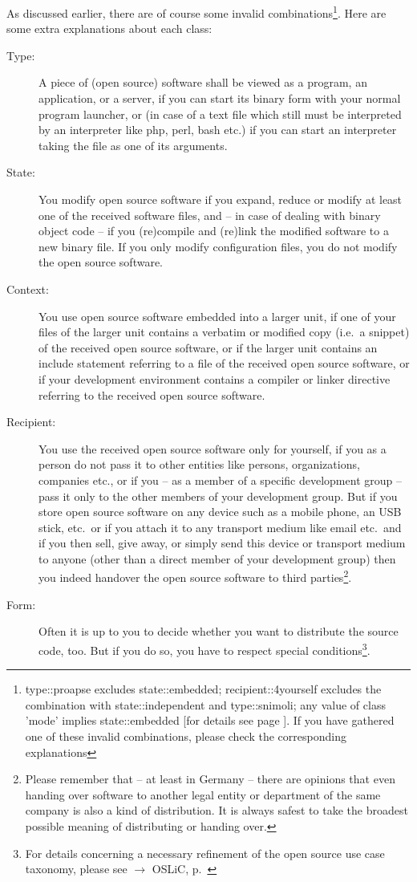 As discussed earlier, there are of course some invalid
combinations\footnote{type::proapse excludes state::embedded;
recipient::4yourself excludes the combination with state::independent and
type::snimoli; any value of class 'mode' implies state::embedded [for details
see page \pageref{InvalidFinderTokenCombinations}]. If you have gathered one of
these invalid combinations, please check the corresponding explanations}. Here
are some extra explanations about each class:

\begin{description}
\item[Type:] A piece of (open source) software shall be viewed as a program, an
application, or a server, if you can start its binary form with your normal
program launcher, or (in case of a text file which still must be interpreted by
an interpreter like php, perl, bash etc.) if you can start an interpreter taking
the file as one of its arguments. \item[State:] You modify open source software
if you expand, reduce or modify at least one of the received software files, and
-- in case of dealing with binary object code -- if you (re)compile and (re)link
the modified software to a new binary file. If you only modify configuration
files, you do not modify the open source software.
\item[Context:] You use open source software embedded into a larger unit, if one
of your files of the larger unit contains a verbatim or modified copy (i.e.\ a
snippet) of the received open source software, or if the larger unit contains an
include statement referring to a file of the received open source software, or
if your development environment contains a compiler or linker directive
referring to the received open source software.
\item[Recipient:] You use the received open source software only for yourself,
if you as a person do not pass it to other entities like persons, organizations,
companies etc., or if you -- as a member of a specific development group -- pass
it only to the other members of your development group. But if you store open
source software on any device such as a mobile phone, an USB stick, etc.\ or if
you attach it to any transport medium like email etc.\ and if you then sell,
give away, or simply send this device or transport medium to anyone (other than
a direct member of your development group) then you indeed handover the open
source software to third parties\footnote{Please remember that -- at least in
Germany -- there are opinions that even handing over software to another legal
entity or department of the same company is also a kind of distribution. It is
always safest to take the broadest possible meaning of distributing or handing
over.}.
\item[Form:] Often it is up to you to decide whether you want to distribute the
source code, too. But if you do so, you have to respect special
conditions\footnote{For details concerning a necessary refinement of the open
source use case taxonomy, please see $\rightarrow$ OSLiC, p.\
\pageref{sec:SourceBinaryDifference}}.
\end{description}

